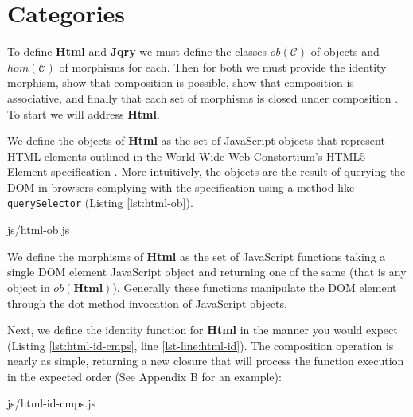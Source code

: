 \documentclass[preprint, leqno]{sigplanconf}
\begin{document}
\section{Categories}

To define \textbf{Html} and \textbf{Jqry} we must define the classes \begin{math}ob(\mathcal{C})\end{math} of objects and \begin{math}hom(\mathcal{C})\end{math} of morphisms for each. Then for both we must provide the identity morphism, show that composition is possible, show that composition is associative, and finally that each set of morphisms is closed under composition \cite[p. ~1]{bib:category-definition}. To start we will address \textbf{Html}.

We define the objects of \textbf{Html} as the set of JavaScript objects that represent HTML elements outlined in the World Wide Web Constortium's HTML5 Element specification \cite{bib:dom}. More intuitively, the objects are the result of querying the DOM in browsers complying with the specification using a method like \verb|querySelector| (Listing \ref{lst:html-ob}).

\begin{bottom}
\begin{lstinputlisting}[
    language=JavaScript,
    caption={Sources of Html objects},
    label={lst:html-ob}
]{js/html-ob.js}
\end{lstinputlisting}
\end{bottom}

We define the morphisms of \textbf{Html} as the set of JavaScript functions taking a single DOM element JavaScript object and returning one of the same (that is any object in \begin{math}ob(\mathbf{Html})\end{math}). Generally these functions manipulate the DOM element through the dot method invocation of JavaScript objects.

Next, we define the identity function for \textbf{Html} in the manner you would expect (Listing \ref{lst:html-id-cmps}, line \ref{lst-line:html-id}). The composition operation is nearly as simple, returning a new closure that will process the function execution in the expected order (See Appendix B for an example):

\begin{bottom}
\begin{lstinputlisting}[
    language=JavaScript,
    caption={Identity and Composition in Html},
    label={lst:html-id-cmps},
    escapeinside={@}{@}
]{js/html-id-cmps.js}
\end{lstinputlisting}
\end{bottom}
\end{document}
